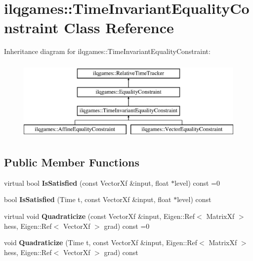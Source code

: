 \hypertarget{classilqgames_1_1_time_invariant_equality_constraint}{}\section{ilqgames\+:\+:Time\+Invariant\+Equality\+Constraint Class Reference}
\label{classilqgames_1_1_time_invariant_equality_constraint}
Inheritance diagram for ilqgames\+:\+:Time\+Invariant\+Equality\+Constraint\+:\begin{figure}[H]
\begin{center}
\leavevmode
\includegraphics[height=4.000000cm]{classilqgames_1_1_time_invariant_equality_constraint}
\end{center}
\end{figure}
\subsection*{Public Member Functions}
\begin{DoxyCompactItemize}
\item 
virtual bool {\bfseries Is\+Satisfied} (const Vector\+Xf \&input, float $\ast$level) const =0\hypertarget{classilqgames_1_1_time_invariant_equality_constraint_a620f76f5b0ab72710ee9232b6b0fdcdd}{}\label{classilqgames_1_1_time_invariant_equality_constraint_a620f76f5b0ab72710ee9232b6b0fdcdd}

\item 
bool {\bfseries Is\+Satisfied} (Time t, const Vector\+Xf \&input, float $\ast$level) const \hypertarget{classilqgames_1_1_time_invariant_equality_constraint_a52d5e80b46973f67ade9950c38b9e379}{}\label{classilqgames_1_1_time_invariant_equality_constraint_a52d5e80b46973f67ade9950c38b9e379}

\item 
virtual void {\bfseries Quadraticize} (const Vector\+Xf \&input, Eigen\+::\+Ref$<$ Matrix\+Xf $>$ hess, Eigen\+::\+Ref$<$ Vector\+Xf $>$ grad) const =0\hypertarget{classilqgames_1_1_time_invariant_equality_constraint_a38219a58ed691409230abbfa710f2126}{}\label{classilqgames_1_1_time_invariant_equality_constraint_a38219a58ed691409230abbfa710f2126}

\item 
void {\bfseries Quadraticize} (Time t, const Vector\+Xf \&input, Eigen\+::\+Ref$<$ Matrix\+Xf $>$ hess, Eigen\+::\+Ref$<$ Vector\+Xf $>$ grad) const \hypertarget{classilqgames_1_1_time_invariant_equality_constraint_af7df31c5e63bf0e00b4b6e7da14b8d69}{}\label{classilqgames_1_1_time_invariant_equality_constraint_af7df31c5e63bf0e00b4b6e7da14b8d69}

\end{DoxyCompactItemize}
